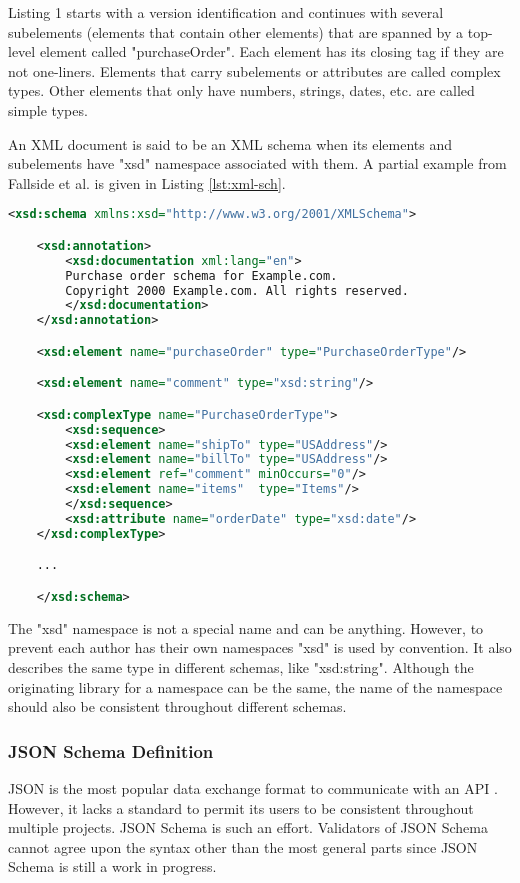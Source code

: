 Listing 1 starts with a version identification and continues with several
subelements (elements that contain other elements) that are spanned by a
top-level element called "purchaseOrder". Each element has its closing tag if
they are not one-liners. Elements that carry subelements or attributes are
called complex types. Other elements that only have numbers, strings, dates,
etc. are called simple types.

An XML document is said to be an XML schema when its elements and subelements
have "xsd" namespace associated with them. A partial example from Fallside et
al. is given in Listing \ref{lst:xml-sch}.

\begin{lstlisting}[language = XML, caption = {A partial XML schema for a home products ordering and billing application.}, captionpos = b, label = lst:xml-sch]
    <xsd:schema xmlns:xsd="http://www.w3.org/2001/XMLSchema">

    <xsd:annotation>
        <xsd:documentation xml:lang="en">
        Purchase order schema for Example.com.
        Copyright 2000 Example.com. All rights reserved.
        </xsd:documentation>
    </xsd:annotation>

    <xsd:element name="purchaseOrder" type="PurchaseOrderType"/>

    <xsd:element name="comment" type="xsd:string"/>

    <xsd:complexType name="PurchaseOrderType">
        <xsd:sequence>
        <xsd:element name="shipTo" type="USAddress"/>
        <xsd:element name="billTo" type="USAddress"/>
        <xsd:element ref="comment" minOccurs="0"/>
        <xsd:element name="items"  type="Items"/>
        </xsd:sequence>
        <xsd:attribute name="orderDate" type="xsd:date"/>
    </xsd:complexType>

    ...

    </xsd:schema>

\end{lstlisting}

The "xsd" namespace is not a special name and can be anything. However, to
prevent each author has their own namespaces "xsd" is used by convention. It
also describes the same type in different schemas, like "xsd:string". Although
the originating library for a namespace can be the same, the name of the
namespace should also be consistent throughout different schemas.

\subsubsection{JSON Schema Definition}
JSON is the most popular data exchange format to communicate with an API
\autocite{Pezoa2016}. However, it lacks a standard to permit its users to be
consistent throughout multiple projects. JSON Schema \autocite{JSONSchema} is
such an effort. Validators of JSON Schema cannot agree upon the syntax other
than the most general parts since JSON Schema is still a work in progress.

